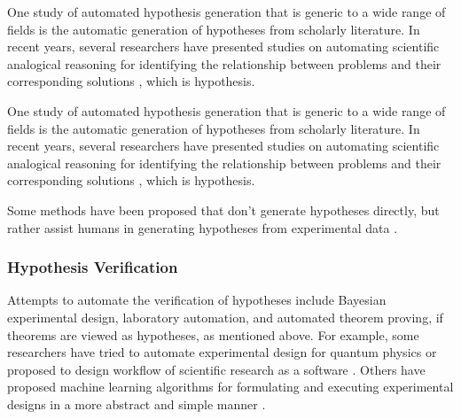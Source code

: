 One study of automated hypothesis generation that is generic to a wide range of fields is the automatic generation of hypotheses from scholarly literature. In recent years, several researchers have presented studies on automating scientific analogical reasoning for identifying the relationship between problems and their corresponding solutions \cite{kang2022augmenting,chan2018solvent}, which is hypothesis.


One study of automated hypothesis generation that is generic to a wide range of fields is the automatic generation of hypotheses from scholarly literature. In recent years, several researchers have presented studies on automating scientific analogical reasoning for identifying the relationship between problems and their corresponding solutions \cite{kang2022augmenting,chan2018solvent}, which is hypothesis.



Some methods have been proposed that don't generate hypotheses directly, but rather assist humans in generating hypotheses from experimental data 
 \cite{friederich2021scientific}.

\subsubsection{Hypothesis Verification}
Attempts to automate the verification of hypotheses include Bayesian experimental design, laboratory automation, and automated theorem proving, if theorems are viewed as hypotheses, as mentioned above. For example, some researchers have tried to automate experimental design for quantum physics \cite{ruiz2022digital} or proposed to design workflow of scientific research as a software \cite{goble2020fair}. Others have proposed machine learning algorithms for formulating and executing experimental designs in a more abstract and simple manner \cite{herrmann2022learning}. 

